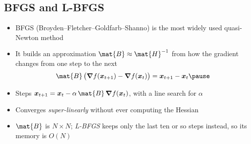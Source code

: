 \begin{slide}
\section[-1]{BFGS and L-BFGS}

\begin{PauseHighLight}
  \begin{itemize}
  \item BFGS (Broyden--Fletcher--Goldfarb--Shanno) is the most widely used
    quasi-Newton method\pause
  \item It builds an approximation $\mat{B}\approx\mat{H}^{-1}$ from how
    the gradient changes from one step to the next
    \begin{align*}
      \mat{B}\,\bigl(\grad f(\bm{x}_{t+1}) - \grad f(\bm{x}_t)\bigr)
      = \bm{x}_{t+1} - \bm{x}_t\pause
    \end{align*}
  \item Steps $\bm{x}_{t+1} = \bm{x}_t - \alpha\,\mat{B}\,\grad f(\bm{x}_t)$,
    with a line search for $\alpha$\pause
  \item Converges \emph{super-linearly} without ever computing the Hessian\pause
  \item $\mat{B}$ is $N\times N$; \emph{L-BFGS} keeps only the last ten
    or so steps instead, so its memory is $O(N)$\pause
  \end{itemize}
\end{PauseHighLight}
\end{slide}


